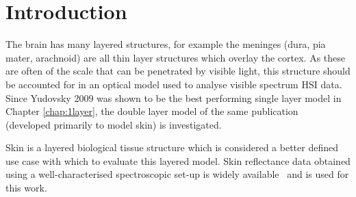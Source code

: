 
\section{Introduction}\label{sec:intro2}
The brain has many layered structures, for example the meninges (dura, pia mater, arachnoid) are all thin layer structures which overlay the cortex. As these are often of the scale that can be penetrated by visible light, this structure should be accounted for in an optical model used to analyse visible spectrum HSI data. Since Yudovsky 2009 was shown to be the best performing single layer model in Chapter \ref{chap:1layer}, the double layer model of the same publication~\cite{Yudovsky2009} (developed primarily to model skin) is investigated. 

Skin is a layered biological tissue structure which is considered a better defined use case with which to evaluate this layered model. Skin reflectance data obtained using a well-characterised spectroscopic set-up is widely available~\cite{Cooksey2017} and is used for this work. 



